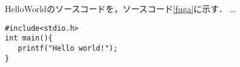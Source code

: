 \documentclass[a4j]{jarticle} %
\begin{document}
HelloWorldのソースコードを，ソースコード\ref{fuga}に示す．
…
\begin{lstlisting}[caption=hoge,label=fuga]
#include<stdio.h>
int main(){
   printf("Hello world!");
}
\end{lstlisting}
\end{document}
